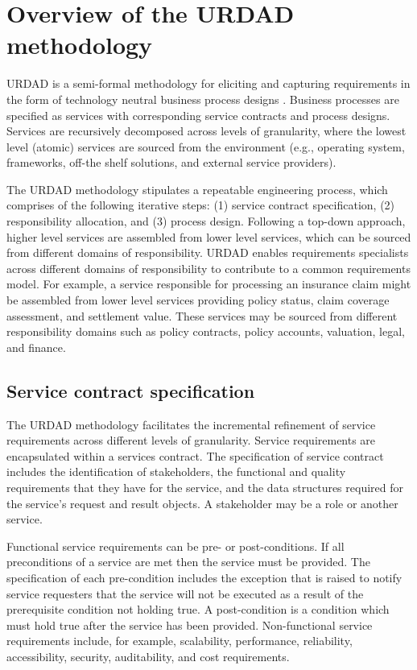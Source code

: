 \section{Overview of the URDAD methodology \label{sec:urdadMethodology}}

URDAD is a semi-formal methodology for eliciting and capturing requirements in the form of technology neutral business process designs \cite{solms_urdad_2010}. Business processes are specified as services with corresponding service contracts and process designs. Services are recursively decomposed across levels of granularity, where the lowest level (atomic) services are sourced from the environment (e.g., operating system, frameworks, off-the shelf solutions, and external service providers). 

The URDAD methodology stipulates a repeatable engineering process, which comprises of the following iterative steps: (1) service contract specification, (2) responsibility allocation, and (3) process design. Following a top-down approach, higher level services are assembled from lower level services, which can be sourced from different domains of responsibility. URDAD enables requirements specialists across different domains of responsibility to contribute to a common requirements model. For example, a service responsible for processing an insurance claim might be assembled from lower level services providing policy status, claim coverage assessment, and settlement value. These services may be sourced from different responsibility domains such as policy contracts, policy accounts, valuation, legal, and finance. 

\subsection{Service contract specification}

The URDAD methodology facilitates the incremental refinement of service requirements across different levels of granularity. Service requirements are encapsulated within a services contract. The specification of service contract includes the identification of stakeholders, the functional and quality requirements that they have for the service, and the data structures required for the service's request and result objects. A stakeholder may be a role or another service.

Functional service requirements can be pre- or post-conditions. If all preconditions of a service are met then the service must be provided. The specification of each pre-condition includes the exception that is raised to notify service requesters that the service will not be executed as a result of the prerequisite condition not holding true. A post-condition is a condition which must hold true after the service has been provided. Non-functional service requirements include, for example, scalability, performance, reliability, accessibility, security, auditability, and cost requirements. 

